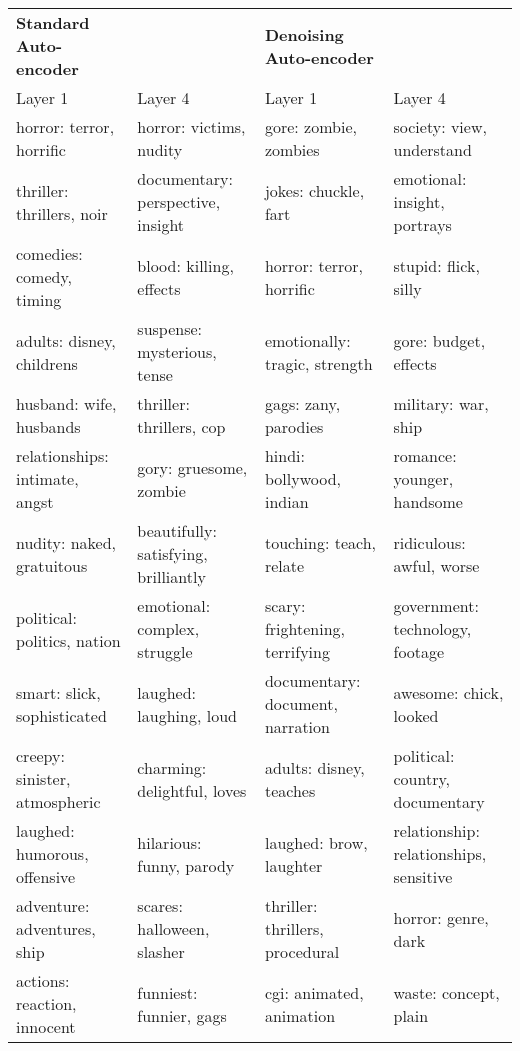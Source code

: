 \begin{sidewaystable}
	\vspace{5 mm}
	
	\setlength\extrarowheight{-3pt}

		\begin{tabular}{llll}

			\bf Standard Auto-encoder &   & \textbf{Denoising Auto-encoder} &   \\
			 Layer 1     &  Layer 4  &  Layer 1   &  Layer 4 \\
\toprule
			horror: terror, horrific & horror: victims, nudity  & gore: zombie, zombies & society: view, understand \\
			thriller: thrillers, noir & documentary: perspective, insight  & jokes: chuckle, fart & emotional: insight, portrays \\
			comedies: comedy, timing & blood: killing, effects   & horror: terror, horrific & stupid: flick, silly  \\
			adults: disney, childrens & suspense: mysterious, tense & emotionally: tragic, strength &  gore: budget, effects  \\
			husband: wife, husbands &  thriller: thrillers, cop  & gags: zany, parodies & military: war, ship \\
			relationships: intimate, angst & gory: gruesome, zombie  & hindi: bollywood, indian & romance: younger, handsome \\
			nudity: naked, gratuitous & beautifully: satisfying, brilliantly & touching: teach, relate & ridiculous: awful, worse   \\
			political: politics, nation & emotional: complex, struggle & scary: frightening, terrifying & government: technology, footage  \\
			smart: slick, sophisticated &  laughed: laughing, loud & documentary: document, narration & awesome: chick, looked\\
			creepy: sinister, atmospheric & charming: delightful, loves & adults: disney, teaches &  political: country, documentary\\
			laughed: humorous, offensive & hilarious: funny, parody & laughed: brow, laughter & relationship: relationships, sensitive \\
			adventure: adventures, ship & scares: halloween, slasher & thriller: thrillers, procedural & horror: genre, dark  \\
			actions: reaction, innocent & funniest: funnier, gags & cgi: animated, animation &  waste: concept, plain   \\

\end{tabular}
\end{sidewaystable}
